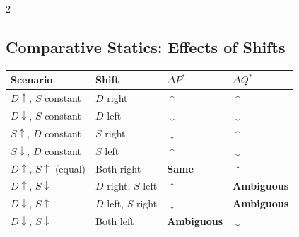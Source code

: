 \documentclass[10pt,a4paper]{article}
\begin{document}
\begin{multicols}{2}
\subsection*{Comparative Statics: Effects of Shifts}
\begin{center}
\begin{tabular}{@{}p{1.8cm}p{1.5cm}p{1.2cm}p{1.2cm}@{}}
\toprule
\textbf{Scenario} & \textbf{Shift} & \textbf{$\Delta P^*$} & \textbf{$\Delta Q^*$} \\
\midrule
$D \uparrow$, $S$ constant & $D$ right & $\uparrow$ & $\uparrow$ \\
$D \downarrow$, $S$ constant & $D$ left & $\downarrow$ & $\downarrow$ \\
$S \uparrow$, $D$ constant & $S$ right & $\downarrow$ & $\uparrow$ \\
$S \downarrow$, $D$ constant & $S$ left & $\uparrow$ & $\downarrow$ \\
\addlinespace
$D \uparrow$, $S \uparrow$ (equal) & Both right & \textbf{Same} & $\uparrow$ \\
$D \uparrow$, $S \downarrow$ & $D$ right, $S$ left & $\uparrow$ & \textbf{Ambiguous} \\
$D \downarrow$, $S \uparrow$ & $D$ left, $S$ right & $\downarrow$ & \textbf{Ambiguous} \\
$D \downarrow$, $S \downarrow$ & Both left & \textbf{Ambiguous} & $\downarrow$ \\
\bottomrule
\end{tabular}
\end{center}


\end{multicols}
\end{document}
